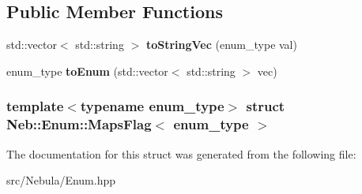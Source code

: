 \subsection*{\-Public \-Member \-Functions}
\begin{DoxyCompactItemize}
\item 
\hypertarget{structNeb_1_1Enum_1_1MapsFlag_af7402e9e44c83dcb37b0daf8d8991727}{std\-::vector$<$ std\-::string $>$ {\bfseries to\-String\-Vec} (enum\-\_\-type val)}\label{structNeb_1_1Enum_1_1MapsFlag_af7402e9e44c83dcb37b0daf8d8991727}

\item 
\hypertarget{structNeb_1_1Enum_1_1MapsFlag_ac05fc6504403a4b0b56b56db54b269c9}{enum\-\_\-type {\bfseries to\-Enum} (std\-::vector$<$ std\-::string $>$ vec)}\label{structNeb_1_1Enum_1_1MapsFlag_ac05fc6504403a4b0b56b56db54b269c9}

\end{DoxyCompactItemize}
\subsubsection*{template$<$typename enum\-\_\-type$>$ struct Neb\-::\-Enum\-::\-Maps\-Flag$<$ enum\-\_\-type $>$}



\-The documentation for this struct was generated from the following file\-:\begin{DoxyCompactItemize}
\item 
src/\-Nebula/\-Enum.\-hpp\end{DoxyCompactItemize}
